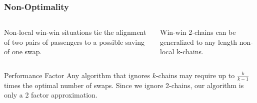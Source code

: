 \documentclass[compress,table]{beamer}
\begin{document}
\begin{frame}[fragile]
\frametitle{Non-Optimality}

\begin{columns}
\begin{column}{.5\textwidth}
Non-local win-win situations tie the alignment of two pairs of passengers to a possible saving of one swap.

\begin{figure}[H]
\end{figure}
\end{column}
\begin{column}{.5\textwidth}
\begin{figure}[H]

\end{figure}

Win-win 2-chains can be generalized to any length non-local k-chains.

\end{column}
\end{columns}

\begin{block}{Performance Factor}
Any algorithm that ignores $k$-chains may require up to $\frac{k}{k-1}$ times the optimal number of swaps.  Since we ignore 2-chains, our algorithm is only a 2 factor approximation.
\end{block}

\end{frame}
\end{document}
